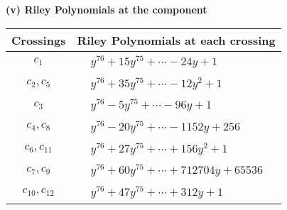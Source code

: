 \documentclass[1p]{elsarticle_modified}
\theoremstyle{definition}
\begin{document}
\newpage\renewcommand{\arraystretch}{1}
\flushleft \textbf{(v) Riley Polynomials at the component}\newline \\
\begin{tabular}{m{50pt}|m{274pt}}
Crossings & \hspace{64pt}Riley Polynomials at each crossing \\
\hline $$\begin{aligned}c_{1}\end{aligned}$$&$\begin{aligned}
&y^{76}+15 y^{75}+\cdots-24 y+1
\end{aligned}$\\
\hline $$\begin{aligned}c_{2},c_{5}\end{aligned}$$&$\begin{aligned}
&y^{76}+35 y^{75}+\cdots-12 y^2+1
\end{aligned}$\\
\hline $$\begin{aligned}c_{3}\end{aligned}$$&$\begin{aligned}
&y^{76}-5 y^{75}+\cdots-96 y+1
\end{aligned}$\\
\hline $$\begin{aligned}c_{4},c_{8}\end{aligned}$$&$\begin{aligned}
&y^{76}-20 y^{75}+\cdots-1152 y+256
\end{aligned}$\\
\hline $$\begin{aligned}c_{6},c_{11}\end{aligned}$$&$\begin{aligned}
&y^{76}+27 y^{75}+\cdots+156 y^2+1
\end{aligned}$\\
\hline $$\begin{aligned}c_{7},c_{9}\end{aligned}$$&$\begin{aligned}
&y^{76}+60 y^{75}+\cdots+712704 y+65536
\end{aligned}$\\
\hline $$\begin{aligned}c_{10},c_{12}\end{aligned}$$&$\begin{aligned}
&y^{76}+47 y^{75}+\cdots+312 y+1
\end{aligned}$\\
\hline
\end{tabular}\\~\\
\end{document}

